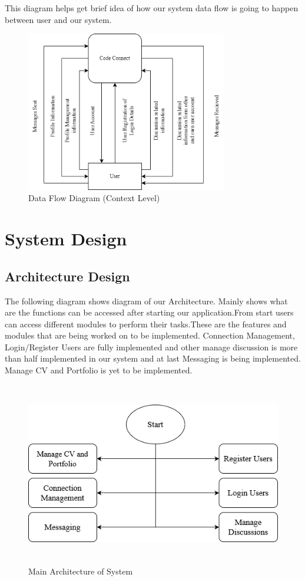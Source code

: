 This diagram helps get brief idea of how our system data flow is going to happen between user and our system.
\begin{figure}[H]
    \centering
    \includegraphics[height = 7cm]{Diagrams/DFD.drawio.png}
    \caption{Data Flow Diagram (Context Level)}
\end{figure}
\newpage
\section{System Design}
\subsection{Architecture Design}
The following diagram shows diagram of our Architecture. Mainly shows what are the functions can be accessed after starting our application.From start users can access different modules to perform their tasks.These are the features and modules that are  being worked on to be implemented. Connection Management, Login/Register Users are fully implemented and other manage discussion is more than half implemented in our system and at last Messaging is being implemented. Manage CV and Portfolio is yet to be implemented.
\begin{figure}[H]
    \includegraphics[height = 8cm]{Diagrams/Main_Block.png}
    \caption{Main Architecture of System}
\end{figure}
\newpage
